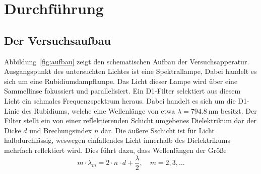 \section{Durchführung}
\label{sec:durchführung}

\subsection{Der Versuchsaufbau}

{\color{red}
Abbildung~\ref{fig:aufbau} zeigt den schematischen Aufbau der Versuchsapperatur. Ausgangspunkt des untersuchten Lichtes ist eine Spektrallampe, Dabei handelt es sich um eine Rubidiumdampflampe. Das Licht dieser Lampe wird über eine Sammellinse fokussiert und parallelisiert. Ein D1-Filter selektiert aus diesem Licht ein schmales Frequenzspektrum heraus. Dabei handelt es sich um die D1-Linie des Rubidiums, welche eine Wellenlänge von etwa $\lambda=\SI{794.8}{\nano\metre}$ besitzt. Der Filter stellt ein von einer refĺektierenden Schicht umgebenes Dielektrikum dar der Dicke $d$ und Brechungsindex $n$ dar. Die äußere Sschicht ist für Licht halbdurchlässig, weswegen einfallendes Licht innerhalb des Dielektrikums mehrfach reflektiert wird. Dies führt dazu, dass Wellenlängen der Größe
%
\begin{equation}
  m\cdot\lambda_m=2\cdot n\cdot d+\frac{\lambda}{2}, \quad m=2,3,\ldots
\end{equation}
%

}
